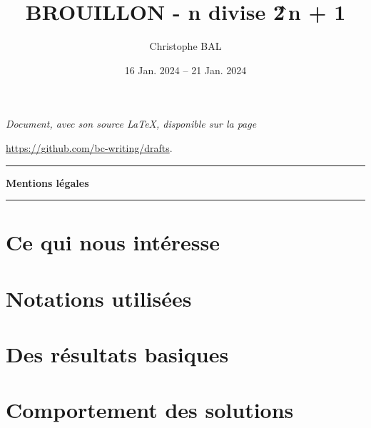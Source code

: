 \documentclass[12pt]{amsart}
\newcommand\contentdir{\jobname}
\begin{document}
\title{BROUILLON - n divise 2\^\,\!n + 1}
\author{Christophe BAL}
\date{16 Jan. 2024 -- 21 Jan. 2024}

\maketitle

\begin{center}
	\itshape
	Document, avec son source \LaTeX, disponible sur la page
	
	\url{https://github.com/bc-writing/drafts}.
\end{center}


\bigskip


\begin{center}
	\hrule\vspace{.3em}
	{
		\fontsize{1.35em}{1em}\selectfont
		\textbf{Mentions \og légales \fg}
	}
			
	\vspace{0.45em}
	\doclicenseThis
	\hrule
\end{center}


\setcounter{tocdepth}{2}
\tableofcontents


\newpage
\section{Ce qui nous intéresse}





\section{Notations utilisées}




\section{Des résultats basiques}



%
%
%


\section{Comportement des solutions}
\end{document}
